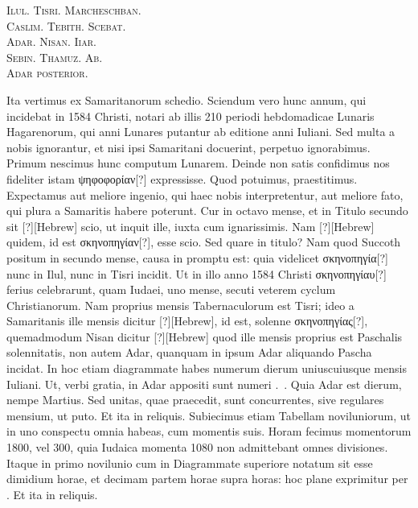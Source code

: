 \begin{center}
\newlength{\emenlen}
\parbox{\emenlen}{
\textsc{Ilul. Tisri. Marcheschban.}\\
\textsc{Caslim. Tebith. Scebat.}\\
\textsc{Adar. Nisan. Iiar.}\\
\textsc{Sebin. Thamuz. Ab.}\\
\textsc{Adar posterior.}
}
\end{center}

Ita vertimus ex Samaritanorum schedio.
Sciendum vero hunc annum,
qui incidebat in 1584 Christi, notari ab illis 210 periodi hebdomadicae
Lunaris Hagarenorum, qui anni Lunares putantur ab editione
anni Iuliani.
Sed multa a nobis ignorantur, et nisi ipsi Samaritani
docuerint, perpetuo ignorabimus.
Primum nescimus hunc
computum Lunarem.
Deinde non satis confidimus nos fideliter
istam \textgreek{ψηφοφορίαν[?]} expressisse.
Quod potuimus, praestitimus.
Expectamus
aut meliore ingenio, qui haec nobis interpretentur, aut
meliore fato, qui plura a Samaritis habere poterunt.
Cur in
octavo mense, et in Titulo secundo sit \texthebrew{[?]}[Hebrew]
 scio, ut inquit ille,
iuxta cum ignarissimis.
Nam \texthebrew{[?]}[Hebrew] quidem,
 id est \textgreek{σκηνοπηγίαν[?]}, esse
scio.
Sed quare in titulo?
Nam quod Succoth positum in secundo
mense, causa in promptu est: quia videlicet \textgreek{σκηνοπηγία[?]}
 nunc in Ilul,
nunc in Tisri incidit. %
Ut in illo anno 1584 Christi
 \textgreek{σκηνοπηγίαυ[?]} ferius
celebrarunt, quam Iudaei, uno mense, secuti veterem cyclum
Christianorum.
Nam proprius mensis Tabernaculorum est Tisri;
ideo a Samaritanis ille mensis dicitur \texthebrew{[?]}[Hebrew],
 id est, solenne \textgreek{σκηνοπηγίας[?]},
quemadmodum Nisan dicitur \texthebrew{[?]}[Hebrew] quod ille mensis proprius
est Paschalis solennitatis, non autem Adar, quanquam in
ipsum Adar aliquando Pascha incidat.
In hoc etiam diagrammate
habes numerum dierum uniuscuiusque mensis Iuliani.
Ut, verbi
gratia, in Adar appositi sunt numeri .~.
Quia Adar
est  dierum, nempe Martius.
Sed unitas, quae praecedit, sunt
concurrentes, sive regulares mensium, ut puto.
Et ita in reliquis.
Subiecimus etiam Tabellam noviluniorum, ut in uno conspectu
omnia habeas, cum momentis suis.
Horam fecimus momentorum
1800, vel 300, quia Iudaica momenta 1080 non admittebant omnes
divisiones.
Itaque in primo novilunio cum in Diagrammate
superiore notatum sit esse dimidium horae, et decimam partem
horae supra  horas: hoc plane exprimitur per .
Et ita in reliquis.

